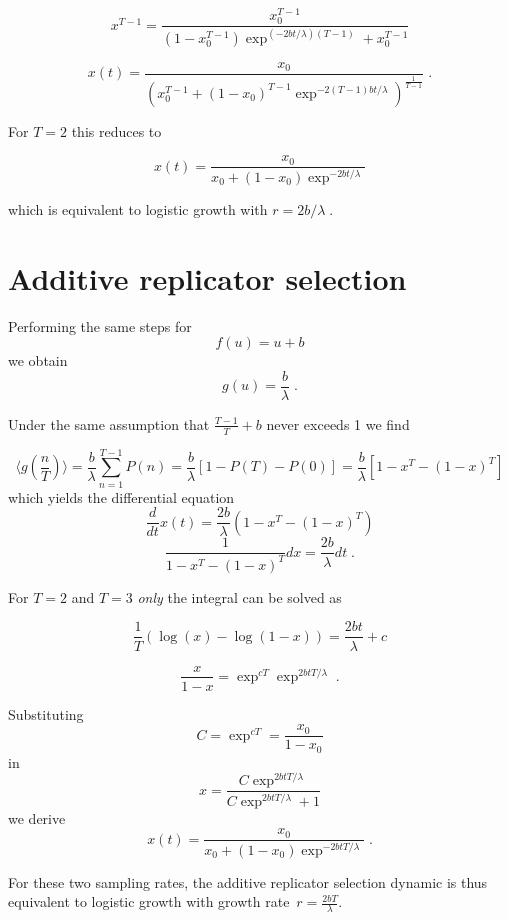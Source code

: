 $$x^{T-1}=\frac{x_0^{T-1}}{(1-x_0^{T-1})\exp^{(-2bt/\lambda)(T-1)}+x_0^{T-1}}$$




$$x(t)=\frac{x_0}{(x_0^{T-1}+(1-x_0)^{T-1}\exp^{-2(T-1)bt/\lambda})^\frac{1}{T-1}}\;.$$

For $T=2$ this reduces to

$$x(t)=\frac{x_0}{x_0+(1-x_0)\exp^{-2bt/\lambda}}$$

which is equivalent to logistic growth with $r=2b/\lambda\;.$

\section{Additive replicator selection}

Performing the same steps for
$$f(u)=u+b$$
we obtain
$$g(u) = \frac{b}{\lambda}\;.$$

Under the same assumption that $\frac{T-1}{T}+b$ never exceeds 1 we find

$$\langle g(\frac{n}{T})\rangle=\frac{b}{\lambda}\sum_{n=1}^{T-1} P(n)=\frac{b}{\lambda}[1-P(T)-P(0)]=\frac{b}{\lambda}[1-x^T-(1-x)^T]$$
which yields the differential equation
$$\frac{d}{dt}x(t)=\frac{2b}{\lambda}(1-x^T-(1-x)^T)$$
$$\frac{1}{1-x^T-(1-x)^T}dx=\frac{2b}{\lambda}dt\;.$$

For $T=2$ and $T=3$ \emph{only} the integral can be solved as

$$\frac{1}{T}(\log(x)-\log(1-x))=\frac{2bt}{\lambda}+c$$

$$\frac{x}{1-x}=\exp^{cT}\exp^{2btT/\lambda}\;.$$

Substituting
$$C=\exp^{cT}=\frac{x_0}{1-x_0}$$
in
$$x=\frac{C\exp^{2btT/\lambda}}{C\exp^{2btT/\lambda}+1}$$
we derive
$$x(t)=\frac{x_0}{x_0+(1-x_0)\exp^{-2btT/\lambda}}\;.$$

For these two sampling rates, the additive replicator selection dynamic is thus equivalent to logistic growth with growth rate~$r=\frac{2bT}{\lambda}$.

